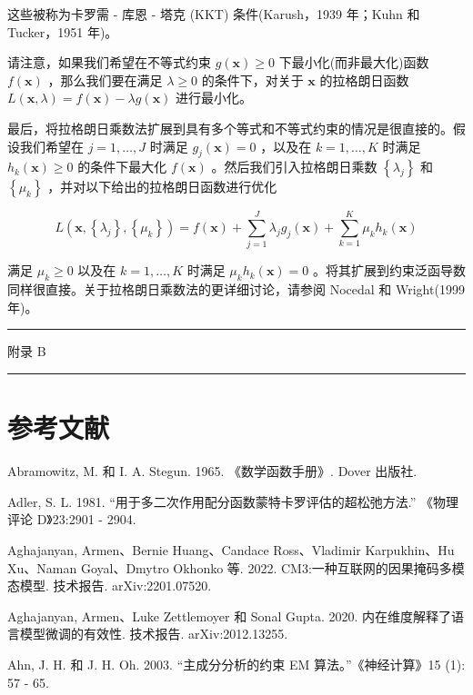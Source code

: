 \documentclass[10pt]{article}
\newcommand{\HRule}{\begin{center}\rule{0.9\linewidth}{0.2mm}\end{center}}
\begin{document}
这些被称为卡罗需 - 库恩 - 塔克 (KKT) 条件(Karush，1939 年；Kuhn 和 Tucker，1951 年)。

请注意，如果我们希望在不等式约束 \(g\left( \mathbf{x}\right)  \geq  0\) 下最小化(而非最大化)函数 \(f\left( \mathbf{x}\right)\) ，那么我们要在满足 \(\lambda  \geq  0\) 的条件下，对关于 \(\mathbf{x}\) 的拉格朗日函数 \(L\left( {\mathbf{x},\lambda }\right)  = f\left( \mathbf{x}\right)  - {\lambda g}\left( \mathbf{x}\right)\) 进行最小化。

最后，将拉格朗日乘数法扩展到具有多个等式和不等式约束的情况是很直接的。假设我们希望在 \(j = 1,\ldots ,J\) 时满足 \({g}_{j}\left( \mathbf{x}\right)  = 0\) ，以及在 \(k = 1,\ldots ,K\) 时满足 \({h}_{k}\left( \mathbf{x}\right)  \geq  0\) 的条件下最大化 \(f\left( \mathbf{x}\right)\) 。然后我们引入拉格朗日乘数 \(\left\{  {\lambda }_{j}\right\}\) 和 \(\left\{  {\mu }_{k}\right\}\) ，并对以下给出的拉格朗日函数进行优化

\[
L\left( {\mathbf{x},\left\{  {\lambda }_{j}\right\}  ,\left\{  {\mu }_{k}\right\}  }\right)  = f\left( \mathbf{x}\right)  + \mathop{\sum }\limits_{{j = 1}}^{J}{\lambda }_{j}{g}_{j}\left( \mathbf{x}\right)  + \mathop{\sum }\limits_{{k = 1}}^{K}{\mu }_{k}{h}_{k}\left( \mathbf{x}\right)  \tag{C.12}
\]

满足 \({\mu }_{k} \geq  0\) 以及在 \(k = 1,\ldots ,K\) 时满足 \({\mu }_{k}{h}_{k}\left( \mathbf{x}\right)  = 0\) 。将其扩展到约束泛函导数同样很直接。关于拉格朗日乘数法的更详细讨论，请参阅 Nocedal 和 Wright(1999 年)。

\HRule

附录 B

\HRule

\section*{参考文献}

Abramowitz, M. 和 I. A. Stegun. 1965. 《数学函数手册》. Dover 出版社.

Adler, S. L. 1981. “用于多二次作用配分函数蒙特卡罗评估的超松弛方法.” 《物理评论 D》23:2901 - 2904.

Aghajanyan, Armen、Bernie Huang、Candace Ross、Vladimir Karpukhin、Hu Xu、Naman Goyal、Dmytro Okhonko 等. 2022. CM3:一种互联网的因果掩码多模态模型. 技术报告. arXiv:2201.07520.

Aghajanyan, Armen、Luke Zettlemoyer 和 Sonal Gupta. 2020. 内在维度解释了语言模型微调的有效性. 技术报告. arXiv:2012.13255.

Ahn, J. H. 和 J. H. Oh. 2003. “主成分分析的约束 EM 算法。”《神经计算》15 (1): 57 - 65.
\end{document}
